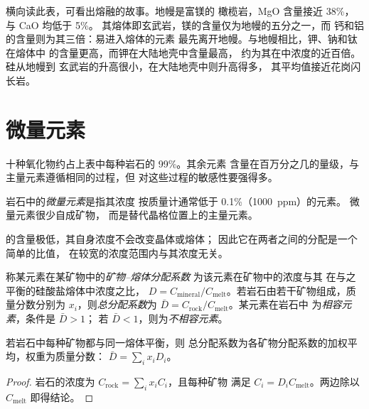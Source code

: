 横向读此表，可看出熔融的故事。地幔是富镁的
橄榄岩，MgO 含量接近 38\%， 与 CaO 均低于 5\%。
其熔体即玄武岩，镁的含量仅为地幔的五分之一，而
钙和铝的含量则为其三倍：易进入熔体的元素
最先离开地幔。与地幔相比，钾、钠和钛在熔体中
的含量更高，而钾在大陆地壳中含量最高，
约为其在中浓度的近百倍。硅从地幔到
玄武岩的升高很小，在大陆地壳中则升高得多，
其平均值接近花岗闪长岩。

\section{微量元素}

十种氧化物约占上表中每种岩石的 99\%。其余元素
含量在百万分之几的量级，与主量元素遵循相同的过程，但
对这些过程的敏感性要强得多。

\begin{definition}[微量元素]\label{def:b2:elements-in-the-earth:trace}
岩石中的\emph{微量元素}是指其浓度
按质量计通常低于 0.1\%（\qty{1000}{ppm}）的元素。
微量元素很少自成矿物，
而是替代晶格位置上的主量元素。
\end{definition}

的含量极低，其自身浓度不会改变晶体或熔体；
因此它在两者之间的分配是一个简单的比值，
在较宽的浓度范围内与其浓度无关。

\begin{definition}\label{def:b2:elements-in-the-earth:partition}
称某元素在某矿物中的\emph{矿物–熔体分配系数}
为该元素在矿物中的浓度与其
在与之平衡的硅酸盐熔体中浓度之比，
$D = C_{\mathrm{mineral}}/C_{\mathrm{melt}}$。若岩石由若干矿物组成，质量分数分别为
$x_i$，则\emph{总分配系数}为
$\bar D = C_{\mathrm{rock}}/C_{\mathrm{melt}}$。某元素在岩石中
为\emph{相容元素}，条件是 $\bar D > 1$；
若 $\bar D < 1$，则为\emph{不相容元素}。
\end{definition}

\begin{proposition}[总分配系数]
\label{prop:b2:elements-in-the-earth:bulk-d}
若岩石中每种矿物都与同一熔体平衡，则
总分配系数为各矿物分配系数的加权平均，权重为质量分数：
$\bar D = \sum_i x_i D_i$。
\end{proposition}

\begin{proof}
岩石的浓度为 $C_{\mathrm{rock}} = \sum_i x_i C_i$，且每种矿物
满足 $C_i = D_i C_{\mathrm{melt}}$。两边除以 $C_{\mathrm{melt}}$ 即得结论。
\end{proof}

